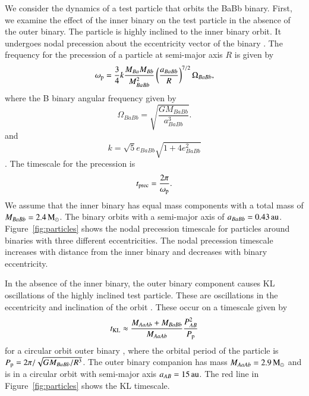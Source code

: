 \documentclass{aa}
\begin{document}
We consider the dynamics of a test particle that orbits the BaBb binary.
%
First, we examine the effect of the inner binary on the test particle in the absence of the outer binary.
%
The particle is highly inclined to the inner binary orbit.
%
It undergoes nodal precession about the eccentricity vector of the binary \citep{Verrier2009,Farago2010,Doolin2011,Chen2019}.
%
The frequency for the precession of a particle at semi-major axis $R$ is given by
\begin{equation}
    \omega_{\rm p}=\frac{3}{4}k \frac{M_{Ba}M_{Bb}}{M_{BaBb}^2}
 \left(\frac{a_{BaBb}}{R}\right)^{7/2} \Omega_{BaBb},
\end{equation}
where the B binary angular frequency given by
\begin{equation}
\Omega_{BaBb}=\sqrt{\frac{G M_{BaBb}}{a_{BaBb}^3}}.
\end{equation}
and
\begin{equation}
    k=\sqrt{5} e_{BaBb} \sqrt{1+4e_{BaBb}^2}
\end{equation}
\citep{Farago2010,Lubow2018}. The timescale for the precession is
\begin{equation}
    t_{\rm prec}= \frac{2\pi}{\omega_{\rm p}}.
\end{equation}
We assume that the inner binary has equal mass components with a total mass of $M_{BaBb}=2.4\,\rm M_\odot$.
%
The binary orbits with a semi-major axis of $a_{BaBb}=0.43\,\rm au$.
%
Figure~\ref{fig:particles} shows the nodal precession timescale for particles around binaries with three different eccentricities.
%
The nodal precession timescale increases with distance from the inner binary and decreases with binary eccentricity. 

In the absence of the inner binary, the outer binary component causes KL oscillations of the highly inclined test particle.
%
These are oscillations in the eccentricity and inclination of the orbit \citep[e.g.][]{Naoz2016}.
%
These occur on a timescale given by
\begin{equation}
    t_{\rm KL}\approx \frac{M_{AaAb}+M_{BaBb}}{M_{AaAb}}\frac{P_{AB}^2}{P_{\rm p}}
\end{equation}
for a circular orbit outer binary \citep{Kiseleva1998,Ford2000}, where the orbital period of the particle is $P_{\rm p}=2\pi/\sqrt{GM_{BaBb}/R^3}$.
%
The outer binary companion has mass  $M_{AaAb}=2.9\,\rm M_\odot$ and is in a circular orbit with semi-major axis $a_{AB}=15\,\rm au$.
%
The red line in Figure~\ref{fig:particles} shows the KL timescale. 
\end{document}
